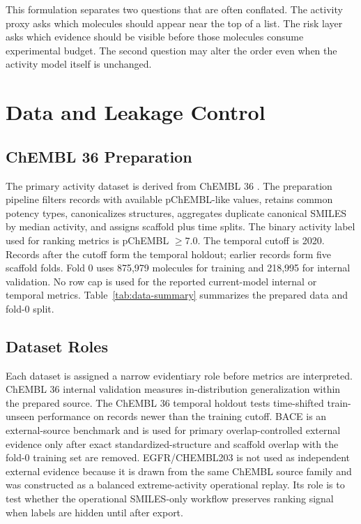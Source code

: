 \documentclass[manuscript=article]{achemso}
\begin{document}
This formulation separates two questions that are often conflated. The
activity proxy asks which molecules should appear near the top of a list. The
risk layer asks which evidence should be visible before those molecules consume
experimental budget. The second question may alter the order even when the
activity model itself is unchanged.

\section{Data and Leakage Control}
\subsection{ChEMBL 36 Preparation}
The primary activity dataset is derived from ChEMBL 36 \cite{chembl36}. The
preparation pipeline filters records with available pChEMBL-like values,
retains common potency types, canonicalizes structures, aggregates duplicate
canonical SMILES by median activity, and assigns scaffold plus time splits.
The binary activity label used for ranking metrics is pChEMBL $\geq 7.0$.
The temporal cutoff is 2020. Records after the cutoff form the temporal
holdout; earlier records form five scaffold folds. Fold 0 uses 875,979
molecules for training and 218,995 for internal validation. No row cap is used
for the reported current-model internal or temporal metrics.
Table~\ref{tab:data-summary} summarizes the prepared data and fold-0 split.
\DataSummaryTable

\subsection{Dataset Roles}
Each dataset is assigned a narrow evidentiary role before metrics are
interpreted. ChEMBL 36 internal validation measures in-distribution
generalization within the prepared source. The ChEMBL 36 temporal holdout
tests time-shifted train-unseen performance on records newer than the training
cutoff. BACE is an external-source benchmark and is used for primary
overlap-controlled external evidence only after exact standardized-structure
and scaffold overlap with the fold-0 training set are removed.
EGFR/CHEMBL203 is not used as independent external evidence because it is drawn
from the same ChEMBL source family and was constructed as a balanced
extreme-activity operational replay. Its role is to test whether the operational
SMILES-only workflow preserves ranking signal when labels are hidden until
after export.
\end{document}
